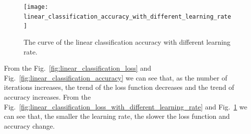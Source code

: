 \documentclass[journal, a4paper]{IEEEtran}
\begin{document}
\begin{figure}[!hbt]
    \begin{center}
    \texttt{[image: linear\_classification\_accuracy\_with\_different\_learning\_rate]}
    \caption{The curve of the linear classification accuracy with different learning rate.}
    \label{fig:linear_classification_accuracy_with_different_learning_rate}
    \end{center}
\end{figure}


From the Fig.~\ref{fig:linear_classification_loss} and Fig.~\ref{fig:linear_classification_accuracy} we can see that, as the number of iterations increases, the trend of the loss function decreases and the trend of accuracy increases.
From the Fig.~\ref{fig:linear_classification_loss_with_different_learning_rate} and Fig.~\ref{fig:linear_classification_accuracy_with_different_learning_rate} we can see that, the smaller the learning rate, the slower the loss function and accuracy change.














\end{document}
